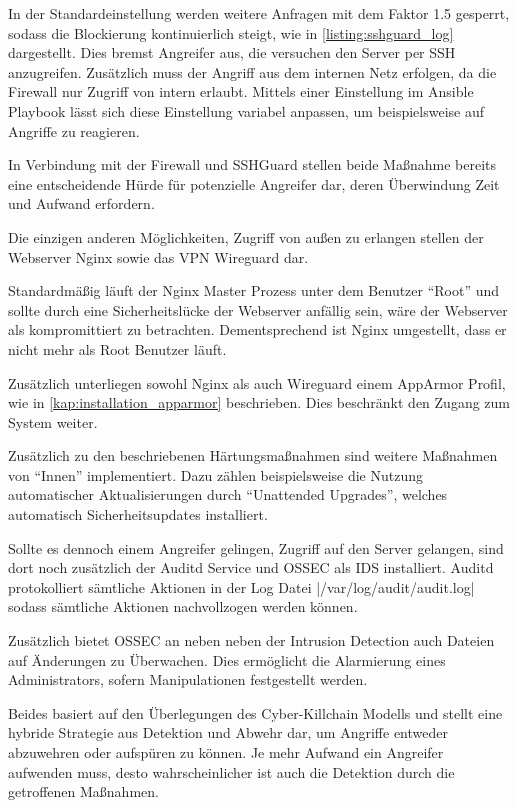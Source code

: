 In der Standardeinstellung werden weitere Anfragen mit dem Faktor 1.5 gesperrt, sodass die Blockierung kontinuierlich steigt, wie in \autoref{listing:sshguard_log} dargestellt. Dies bremst Angreifer aus, die versuchen den Server per SSH anzugreifen. Zusätzlich muss der Angriff aus dem internen Netz erfolgen, da die Firewall nur Zugriff von intern erlaubt. Mittels einer Einstellung im Ansible Playbook lässt sich diese Einstellung variabel anpassen, um beispielsweise auf Angriffe zu reagieren.

In Verbindung mit der Firewall und SSHGuard stellen beide Maßnahme bereits eine entscheidende Hürde für potenzielle Angreifer dar, deren Überwindung Zeit und Aufwand erfordern.

Die einzigen anderen Möglichkeiten, Zugriff von außen zu erlangen stellen der Webserver Nginx sowie das \ac{VPN} Wireguard dar.

Standardmäßig läuft der Nginx Master Prozess unter dem Benutzer \enquote{Root} und sollte durch eine Sicherheitslücke der Webserver anfällig sein, wäre der Webserver als kompromittiert zu betrachten. Dementsprechend ist Nginx umgestellt, dass er nicht mehr als Root Benutzer läuft.

Zusätzlich unterliegen sowohl Nginx als auch Wireguard einem AppArmor Profil, wie in \autoref{kap:installation_apparmor} beschrieben. Dies beschränkt den Zugang zum System weiter.

Zusätzlich zu den beschriebenen Härtungsmaßnahmen sind weitere Maßnahmen von \enquote{Innen} implementiert. Dazu zählen beispielsweise die Nutzung automatischer Aktualisierungen durch \enquote{Unattended Upgrades}, welches automatisch Sicherheitsupdates installiert.

Sollte es dennoch einem Angreifer gelingen, Zugriff auf den Server gelangen, sind dort noch zusätzlich der Auditd Service und OSSEC als \ac{IDS} installiert. Auditd protokolliert sämtliche Aktionen in der Log Datei |/var/log/audit/audit.log| sodass sämtliche Aktionen nachvollzogen werden können.

Zusätzlich bietet OSSEC an neben neben der Intrusion Detection auch Dateien auf Änderungen zu Überwachen. Dies ermöglicht die Alarmierung eines Administrators, sofern Manipulationen festgestellt werden.


Beides basiert auf den Überlegungen des Cyber-Killchain Modells und stellt eine hybride Strategie aus Detektion und Abwehr dar, um Angriffe entweder abzuwehren oder aufspüren zu können. Je mehr Aufwand ein Angreifer aufwenden muss, desto wahrscheinlicher ist auch die Detektion durch die getroffenen Maßnahmen.